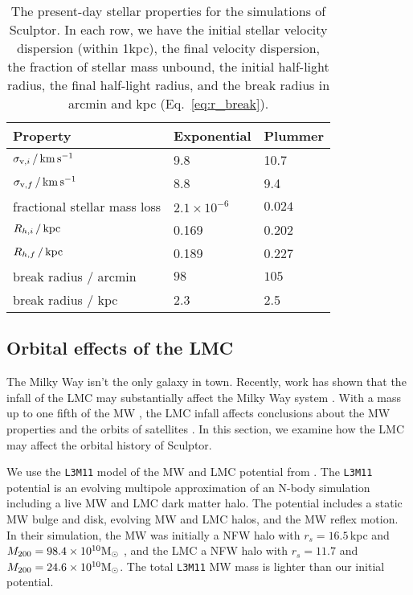 \begin{table*}[t]
\centering
\caption[Simulation results for Sculptor’s stars]{The present-day stellar properties for the simulations of Sculptor. In each row, we have the initial stellar velocity dispersion (within 1kpc), the final velocity dispersion, the fraction of stellar mass unbound, the initial half-light radius, the final half-light radius, and the break radius in arcmin and kpc (Eq. \ref{eq:r_break}). }
\label{tbl:scl_sim_stars_results}
\begin{tabular}{lll}
\toprule
Property & Exponential & Plummer\\
\midrule
$\sigma_{{\rm v}, i}\,/\,{\rm km\,s^{-1}}$ & 9.8 & 10.7\\
$\sigma_{{\rm v}, f} \,/\,{\rm km\,s^{-1}}$ & 8.8 & 9.4\\
fractional stellar mass loss & $2.1\times 10^{-6}$ & $0.024$\\
$R_{h, i}\,/\,{\rm kpc}$ & 0.169 & 0.202\\
$R_{h, f}\,/\,{\rm kpc}$ & 0.189 & 0.227\\
break radius / arcmin & $98$ & $105$\\
break radius / kpc & 2.3 & 2.5\\
\bottomrule
\end{tabular}
\end{table*}

\subsection{Orbital effects of the LMC}\label{sec:scl_lmc}

The Milky Way isn't the only galaxy in town. Recently, work has shown
that the infall of the LMC may substantially affect the Milky Way system
\citep[e.g.,][]{erkal+2019, cautun+2019, garavito-camargo+2021, vasiliev2023}.
With a mass up to one fifth of the MW \citep[e.g.,][]{penarrubia+2015},
the LMC infall affects conclusions about the MW properties and the
orbits of satellites \citep[see
e.g.,][]{patel+2020, battaglia+2022, correamagnus+vasiliev2022}. In this
section, we examine how the LMC may affect the orbital history of
Sculptor.

We use the \texttt{L3M11} model of the MW and LMC potential from
\citet{vasiliev2024}. The \texttt{L3M11} potential is an evolving
multipole approximation of an N-body simulation including a live MW and
LMC dark matter halo. The potential includes a static MW bulge and disk,
evolving MW and LMC halos, and the MW reflex motion. In their
simulation, the MW was initially a NFW halo with \(r_s=16.5\,\)kpc and
\(M_{\rm 200}= 98.4\times10^{10}{\rm M}_{\odot}\) , and the LMC a NFW halo with
\(r_s=11.7\) and \(M_{200} = 24.6 \times 10^{10} {\rm M}_{\odot}\). The total
\texttt{L3M11} MW mass is lighter than our initial \citet{EP2020}
potential.

